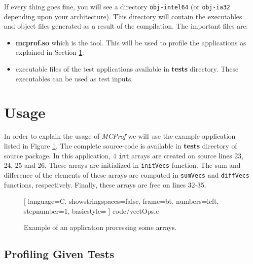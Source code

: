 \documentclass[11pt]{article}
\newcommand{\MCPROF}{\emph{MCProf}}
\begin{document}
If every thing goes fine, you will see a directory \verb|obj-intel64| (or
\verb|obj-ia32| depending upon your architecture). This directory will contain
the executables and object files generated as a result of the compilation. The
important files are:

\begin{itemize}

\item \textbf{mcprof.so} which is the tool. This will be used to profile the
    applications as explained in Section \ref{sec:usage}.

\item executable files of the test applications available in \textbf{tests}
    directory.  These executables can be used as test inputs.

\end{itemize}



\section{Usage}
\label{sec:usage}

In order to explain the usage of \MCPROF{} we will use the example application
listed in Figure \ref{fig:vectOps}. The complete source-code is available in
\textbf{tests} directory of source package. In this application, $4$ \verb|int|
arrays are created on source lines 23, 24, 25 and 26. These arrays are
initialized in \verb|initVecs| function. The sum and difference of the elements
of these arrays are computed in \verb|sumVecs| and \verb|diffVecs| functions,
respectively.  Finally, these arrays are free on lines 32-35.

\begin{figure} %
    \centering
%     
    
    [
    language=C,
    showstringspaces=false,
    frame=bt,
    numbers=left,
    stepnumber=1,
    basicstyle=\small %
    ] {code/vectOps.c}
    \caption{Example of an application processing some arrays.}
    \label{fig:vectOps}
\end{figure}


\subsection{Profiling Given Tests}
\end{document}

